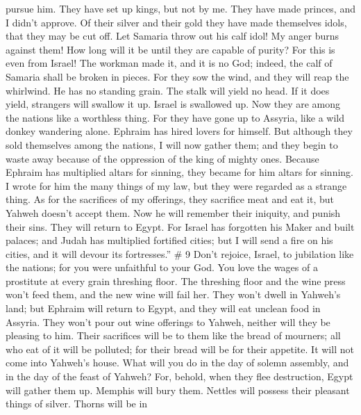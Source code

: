 pursue him.  They have set up kings, but not by me. They
have made princes, and I didn't approve. Of their silver and their gold
they have made themselves idols, that they may be cut off.
 Let Samaria throw out his calf idol! My anger burns
against them! How long will it be until they are capable of purity?
 For this is even from Israel! The workman made it, and it
is no God; indeed, the calf of Samaria shall be broken in pieces.
 For they sow the wind, and they will reap the whirlwind.
He has no standing grain. The stalk will yield no head. If it does
yield, strangers will swallow it up.  Israel is swallowed
up. Now they are among the nations like a worthless thing.
 For they have gone up to Assyria, like a wild donkey
wandering alone. Ephraim has hired lovers for himself. 
But although they sold themselves among the nations, I will now gather
them; and they begin to waste away because of the oppression of the king
of mighty ones.  Because Ephraim has multiplied altars
for sinning, they became for him altars for sinning.  I
wrote for him the many things of my law, but they were regarded as a
strange thing.  As for the sacrifices of my offerings,
they sacrifice meat and eat it, but Yahweh doesn't accept them. Now he
will remember their iniquity, and punish their sins. They will return to
Egypt.  For Israel has forgotten his Maker and built
palaces; and Judah has multiplied fortified cities; but I will send a
fire on his cities, and it will devour its fortresses.'' \# 9
 Don't rejoice, Israel, to jubilation like the nations;
for you were unfaithful to your God. You love the wages of a prostitute
at every grain threshing floor.  The threshing floor and
the wine press won't feed them, and the new wine will fail her.
 They won't dwell in Yahweh's land; but Ephraim will
return to Egypt, and they will eat unclean food in Assyria.
 They won't pour out wine offerings to Yahweh, neither
will they be pleasing to him. Their sacrifices will be to them like the
bread of mourners; all who eat of it will be polluted; for their bread
will be for their appetite. It will not come into Yahweh's house.
 What will you do in the day of solemn assembly, and in
the day of the feast of Yahweh?  For, behold, when they
flee destruction, Egypt will gather them up. Memphis will bury them.
Nettles will possess their pleasant things of silver. Thorns will be in
